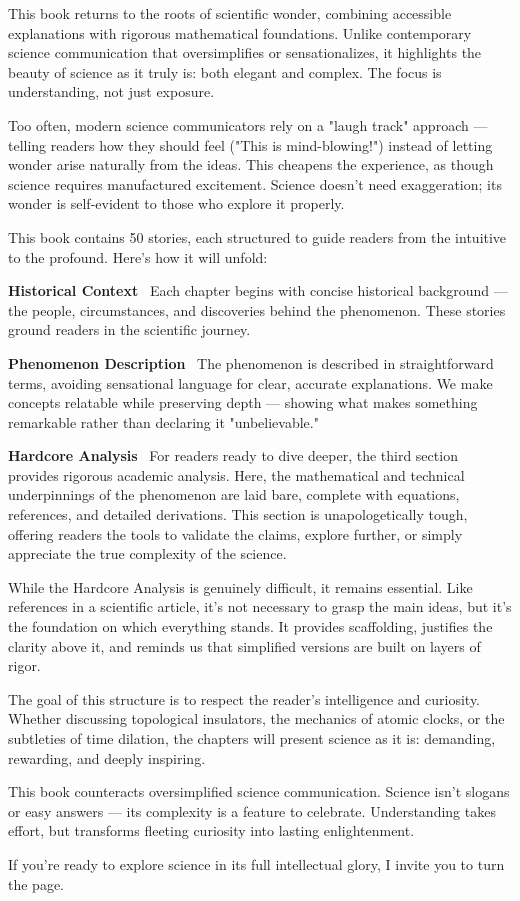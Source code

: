This book returns to the roots of scientific wonder, combining accessible explanations with rigorous mathematical foundations. Unlike contemporary science communication that oversimplifies or sensationalizes, it highlights the beauty of science as it truly is: both elegant and complex. The focus is understanding, not just exposure.

Too often, modern science communicators rely on a "laugh track" approach — telling readers how they should feel ("This is mind-blowing!") instead of letting wonder arise naturally from the ideas. This cheapens the experience, as though science requires manufactured excitement. Science doesn't need exaggeration; its wonder is self-evident to those who explore it properly.

This book contains 50 stories, each structured to guide readers from the intuitive to the profound. Here’s how it will unfold:

\textbf{Historical Context} \ Each chapter begins with concise historical background — the people, circumstances, and discoveries behind the phenomenon. These stories ground readers in the scientific journey.

\textbf{Phenomenon Description} \ The phenomenon is described in straightforward terms, avoiding sensational language for clear, accurate explanations. We make concepts relatable while preserving depth — showing what makes something remarkable rather than declaring it "unbelievable."

\textbf{Hardcore Analysis} \ For readers ready to dive deeper, the third section provides rigorous academic analysis. Here, the mathematical and technical underpinnings of the phenomenon are laid bare, complete with equations, references, and detailed derivations. This section is unapologetically tough, offering readers the tools to validate the claims, explore further, or simply appreciate the true complexity of the science.

While the Hardcore Analysis is genuinely difficult, it remains essential. Like references in a scientific article, it's not necessary to grasp the main ideas, but it's the foundation on which everything stands. It provides scaffolding, justifies the clarity above it, and reminds us that simplified versions are built on layers of rigor.

The goal of this structure is to respect the reader’s intelligence and curiosity. Whether discussing topological insulators, the mechanics of atomic clocks, or the subtleties of time dilation, the chapters will present science as it is: demanding, rewarding, and deeply inspiring.

This book counteracts oversimplified science communication. Science isn't slogans or easy answers — its complexity is a feature to celebrate. Understanding takes effort, but transforms fleeting curiosity into lasting enlightenment.

If you’re ready to explore science in its full intellectual glory, I invite you to turn the page.

